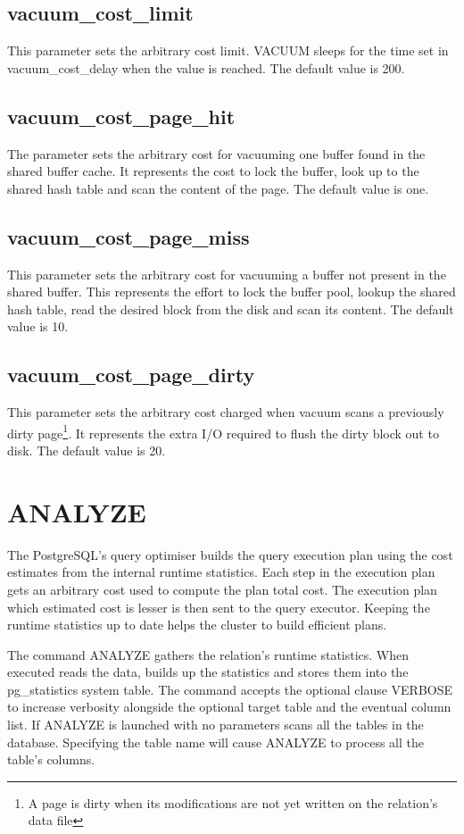 \subsection{vacuum\_cost\_limit}
This parameter sets the arbitrary cost limit. VACUUM sleeps for the time set in vacuum\_cost\_delay when
the value is reached. The default value is 200.

\subsection{vacuum\_cost\_page\_hit}
The parameter sets the arbitrary cost for vacuuming one buffer found in the shared buffer cache. It
represents the cost to lock the buffer, look up to the shared hash table and scan the content of the page.
The default value is one.

\subsection{vacuum\_cost\_page\_miss}
This parameter sets the arbitrary cost for vacuuming a buffer not present in the shared buffer. This
represents the effort to lock the buffer pool, lookup the shared hash table, read the desired block
from the disk and scan its content. The default value is 10.

\subsection{vacuum\_cost\_page\_dirty}
This parameter sets the arbitrary cost charged when vacuum scans a previously dirty page\footnote{A
page is dirty when its modifications are not yet written on the relation's data file}. It represents the
extra I/O required to flush the dirty block out to disk. The default value is 20.

\section{ANALYZE}
\label{sec:ANALYZE}
The PostgreSQL's query optimiser builds the query execution plan using the cost estimates from the
internal runtime statistics. Each step in the execution plan gets an arbitrary cost used to compute the
plan total cost. The execution plan which estimated cost is lesser is then sent to the query executor.
Keeping the runtime statistics up to date helps the cluster to build efficient plans.\newline

The command ANALYZE gathers the relation's runtime statistics. When executed reads the
data, builds up the statistics and stores them into the pg\_statistics system table. The command accepts the optional clause VERBOSE to increase verbosity alongside the
optional target table and the eventual column list. If ANALYZE is launched with no parameters scans all the
tables in the database. Specifying the table name will cause ANALYZE to process all the table's
columns.\newline

